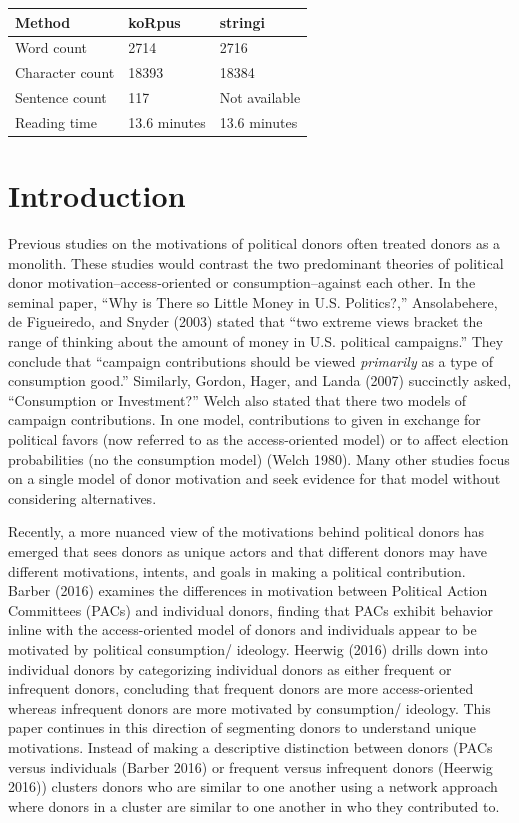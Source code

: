 \documentclass[12pt,]{article}
\begin{document}
\vskip -8.5pt



\noindent \doublespacing 

\begin{longtable}[]{@{}lll@{}}
\toprule
Method & koRpus & stringi\tabularnewline
\midrule
\endhead
Word count & 2714 & 2716\tabularnewline
Character count & 18393 & 18384\tabularnewline
Sentence count & 117 & Not available\tabularnewline
Reading time & 13.6 minutes & 13.6 minutes\tabularnewline
\bottomrule
\end{longtable}

\newpage

\hypertarget{introduction}{%
\section{Introduction}\label{introduction}}

Previous studies on the motivations of political donors often treated
donors as a monolith. These studies would contrast the two predominant
theories of political donor motivation--access-oriented or
consumption--against each other. In the seminal paper, ``Why is There so
Little Money in U.S. Politics?,'' Ansolabehere, de Figueiredo, and
Snyder (2003) stated that ``two extreme views bracket the range of
thinking about the amount of money in U.S. political campaigns.'' They
conclude that ``campaign contributions should be viewed \emph{primarily}
as a type of consumption good.'' Similarly, Gordon, Hager, and Landa
(2007) succinctly asked, ``Consumption or Investment?'' Welch also
stated that there two models of campaign contributions. In one model,
contributions to given in exchange for political favors (now referred to
as the access-oriented model) or to affect election probabilities (no
the consumption model) (Welch 1980). Many other studies focus on a
single model of donor motivation and seek evidence for that model
without considering alternatives.

Recently, a more nuanced view of the motivations behind political donors
has emerged that sees donors as unique actors and that different donors
may have different motivations, intents, and goals in making a political
contribution. Barber (2016) examines the differences in motivation
between Political Action Committees (PACs) and individual donors,
finding that PACs exhibit behavior inline with the access-oriented model
of donors and individuals appear to be motivated by political
consumption/ ideology. Heerwig (2016) drills down into individual donors
by categorizing individual donors as either frequent or infrequent
donors, concluding that frequent donors are more access-oriented whereas
infrequent donors are more motivated by consumption/ ideology. This
paper continues in this direction of segmenting donors to understand
unique motivations. Instead of making a descriptive distinction between
donors (PACs versus individuals (Barber 2016) or frequent versus
infrequent donors (Heerwig 2016)) clusters donors who are similar to one
another using a network approach where donors in a cluster are similar
to one another in who they contributed to.
\end{document}

